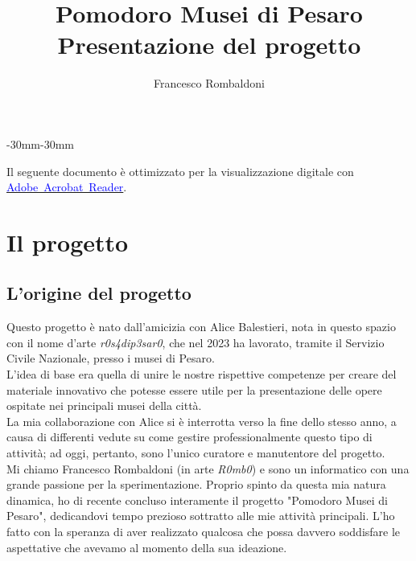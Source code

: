 \documentclass[hidelinks,12pt,a4paper]{article}
\begin{document}
    \begin{flushleft}
        
        \title{\textbf{Pomodoro Musei di Pesaro}\\\small{Presentazione del progetto}}
        \author{Francesco Rombaldoni}
        \date{}
        
        \maketitle
        
        \begin{adjustwidth}{-30mm}{-30mm}
            \vspace*{\fill}
            \centering
            \setlength{\fboxrule}{2pt}
            \fbox
            {
                \begin{minipage}{0.85\linewidth}
                    Il seguente documento è ottimizzato per la visualizzazione digitale con \href{https://get.adobe.com/it/reader/}{\textcolor{blue}{Adobe~Acrobat~Reader}}.  
                \end{minipage}
            }
        \end{adjustwidth}
        
        \setcounter{page}{1}
        \newpage
        \tableofcontents
        \newpage
        
        \section{Il progetto}
        \subsection{L'origine del progetto}

        Questo progetto è nato dall'amicizia con Alice Balestieri, nota in questo spazio con il nome d'arte \textit{r0s4dip3sar0}, che nel 2023 ha lavorato, tramite il Servizio Civile Nazionale, presso i musei di Pesaro.\\
        L'idea di base era quella di unire le nostre rispettive competenze per creare del materiale innovativo che potesse essere utile per la presentazione delle opere ospitate nei principali musei della città.\\
        La mia collaborazione con Alice si è interrotta verso la fine dello stesso anno, a causa di differenti vedute su come gestire professionalmente questo tipo di attività; ad oggi, pertanto, sono l'unico curatore e manutentore del progetto.\\ 
        Mi chiamo Francesco Rombaldoni (in arte \textit{R0mb0}) e sono un informatico con una grande passione per la sperimentazione. Proprio spinto da questa mia natura dinamica, ho di recente concluso interamente il progetto "Pomodoro Musei di Pesaro", dedicandovi tempo prezioso sottratto alle mie attività principali. L'ho fatto con la speranza di aver realizzato qualcosa che possa davvero soddisfare le aspettative che avevamo al momento della sua ideazione.\\


\end{flushleft}
\end{document}
